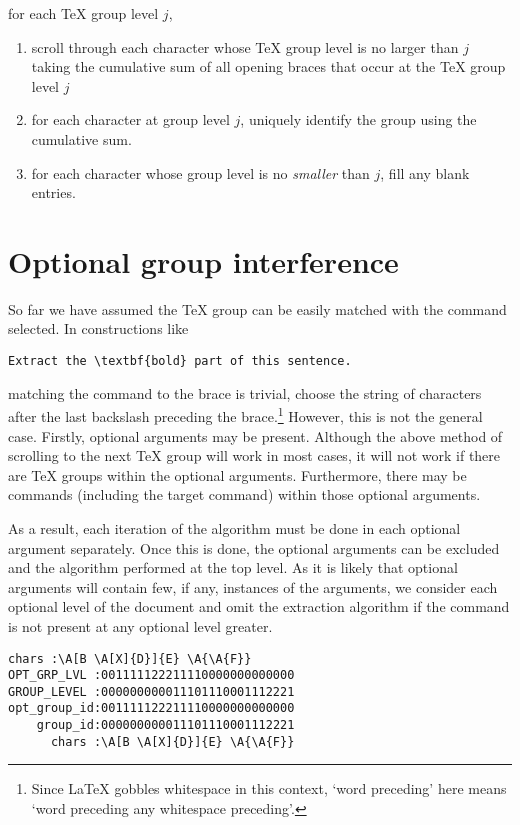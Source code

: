 \documentclass[b5paper]{scrartcl}\usepackage[]{graphicx}\usepackage[]{color}
\let\oldLaTeX\LaTeX
\renewcommand{\LaTeX}{\textrm{\oldLaTeX}}
\begin{document}
for each \TeX{} group level \(j\),
\begin{enumerate}
\item scroll through each character whose \TeX{} group level is no larger than \(j\) taking the cumulative sum of all opening braces that occur at the \TeX{} group level \(j\)
\item for each character at group level \(j\), uniquely identify the group using the cumulative sum.
\item for each character whose group level is no \emph{smaller} than \(j\), fill any blank entries.
\end{enumerate}

\section{Optional group interference}
So far we have assumed the \TeX{} group can be easily matched with the command selected.
In constructions like
\begin{lstlisting}
Extract the \textbf{bold} part of this sentence.
\end{lstlisting}
matching the command to the brace is trivial, choose the string of characters after the last backslash preceding the brace.\footnote{Since \LaTeX{} gobbles whitespace in this context, `word preceding' here means `word preceding any whitespace preceding'.}
However, this is not the general case.
Firstly, optional arguments may be present. 
Although the above method of scrolling to the next \TeX{} group will work in most cases, it will not work if there are \TeX{} groups within the optional arguments.
Furthermore, there may be commands (including the target command) within those optional arguments.

As a result, each iteration of the algorithm must be done in each optional argument separately.
Once this is done, the optional arguments can be excluded and the algorithm performed at the top level.
As it is likely that optional arguments will contain few, if any, instances of the arguments,
 we consider each optional level of the document and omit the extraction algorithm if the command is not present at any optional level greater.


\begin{lstlisting}[columns=fixed]
      chars :\A[B \A[X]{D}]{E} \A{\A{F}}
OPT_GRP_LVL :001111122211110000000000000
GROUP_LEVEL :000000000011101110001112221
opt_group_id:001111122211110000000000000
    group_id:000000000011101110001112221
      chars :\A[B \A[X]{D}]{E} \A{\A{F}}
\end{lstlisting}
\end{document}
